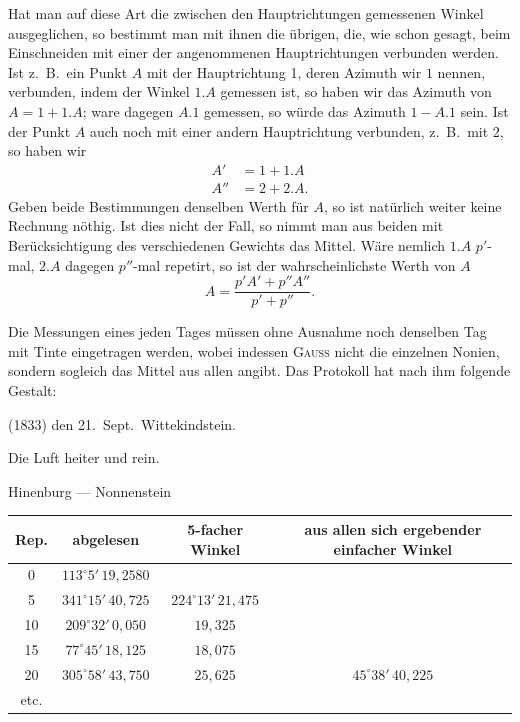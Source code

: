 \documentclass[12pt,a4paper]{article}
\theoremstyle{plain}
\theoremstyle{definition}
\theoremstyle{remark}
\begin{document}
Hat man auf diese Art die zwischen den Hauptrichtungen gemessenen Winkel ausgeglichen, so bestimmt man mit ihnen die \"ubrigen, die, wie schon gesagt, beim Einschneiden mit einer der angenommenen Hauptrichtungen verbunden werden. Ist z.\ B.\ ein Punkt $A$ mit der Hauptrichtung 1, deren Azimuth wir $\mathfrak{1}$ nennen, verbunden, indem der Winkel $1.A$ gemessen ist, so haben wir das Azimuth von $A = \mathfrak{1} + 1.A$; ware dagegen $A.1$ gemessen, so w\"urde das Azimuth $\mathfrak{1} - A.1$ sein. Ist der Punkt $A$ auch noch mit einer andern Hauptrichtung verbunden, z.\ B.\ mit 2, so haben wir
\begin{align*}
A' &= \mathfrak{1} + 1.A\\
A'' &= \mathfrak{2} + 2.A.
\end{align*}
Geben beide Bestimmungen denselben Werth f\"ur $A$, so ist nat\"urlich weiter keine Rechnung n\"othig. Ist dies nicht der Fall, so nimmt man aus beiden mit Ber\"ucksichtigung des verschiedenen Gewichts das Mittel. W\"are nemlich $1.A$ $p'$-mal, $2.A$ dagegen $p''$-mal repetirt, so ist der wahrscheinlichste Werth von $A$
\[A = \frac{p'A' + p''A''}{p' + p''}.\]

Die Messungen eines jeden Tages m\"ussen ohne Ausnahme noch denselben Tag mit Tinte eingetragen werden, wobei indessen \textsc{Gauss} nicht die einzelnen Nonien, sondern sogleich das Mittel aus allen angibt. Das Protokoll hat nach ihm folgende Gestalt:
\begin{center}
(1833) den 21.\ Sept.\ Wittekindstein.

Die Luft heiter und rein.

Hinenburg --- Nonnenstein
\end{center}
\begin{center}
\begin{tabular}{c|c|c|c}
Rep. & abgelesen & 5-facher Winkel & aus allen sich ergebender einfacher Winkel\\
\hline
0 & $113^{\circ}5'\,19{,}2580$ & & \\
5 & $341^{\circ}15'\,40{,}725$ & $224^{\circ}13'\,21{,}475$ & \\
10 & $209^{\circ}32'\,0{,}050$ & $19{,}325$ & \\
15 & $77^{\circ}45'\,18{,}125$ & $18{,}075$ & \\
20 & $305^{\circ}58'\,43{,}750$ & $25{,}625$ & $45^{\circ}38'\,40{,}225$\\
etc.
\end{tabular}
\end{center}
\end{document}
